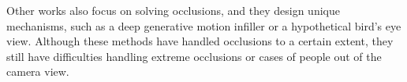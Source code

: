 %
Other works \cite{yuan2022glamr,BEV,huang2022occluded} also focus on solving occlusions, and they design unique mechanisms, such as a deep generative motion infiller or a hypothetical bird's eye view.
%
%
Although these methods have handled occlusions to a certain extent, they still have difficulties handling extreme occlusions or cases of people out of the camera view.
%
